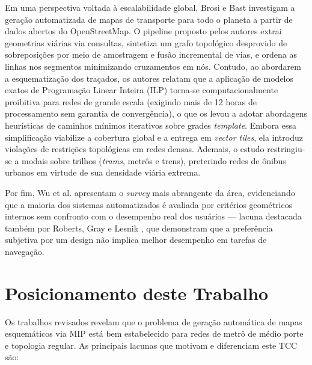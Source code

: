 \documentclass[cic,tc]{infufrgs}
\begin{document}
Em uma perspectiva voltada à escalabilidade global, Brosi e Bast \cite{brosi2023large} investigam a geração automatizada de mapas de transporte para todo o planeta a partir de dados abertos do OpenStreetMap. O pipeline proposto pelos autores extrai geometrias viárias via consultas, sintetiza um grafo topológico desprovido de sobreposições por meio de amostragem e fusão incremental de vias, e ordena as linhas nos segmentos minimizando cruzamentos em nós. Contudo, ao abordarem a esquematização dos traçados, os autores relatam que a aplicação de modelos exatos de Programação Linear Inteira (ILP) torna-se computacionalmente proibitiva para redes de grande escala (exigindo mais de 12 horas de processamento sem garantia de convergência), o que os levou a adotar abordagens heurísticas de caminhos mínimos iterativos sobre grades \textit{template}. Embora essa simplificação viabilize a cobertura global e a entrega em \textit{vector tiles}, ela introduz violações de restrições topológicas em redes densas. Ademais, o estudo restringiu-se a modais sobre trilhos (\textit{trams}, metrôs e trens), preterindo redes de ônibus urbanos em virtude de sua densidade viária extrema.

Por fim, Wu et al. \cite{Wu2020} apresentam o \textit{survey} mais abrangente da área, evidenciando que a maioria dos sistemas automatizados é avaliada por critérios geométricos internos sem confronto com o desempenho real dos usuários — lacuna destacada também por Roberts, Gray e Lesnik \cite{Roberts2016}, que demonstram que a preferência subjetiva por um design não implica melhor desempenho em tarefas de navegação.

\section{Posicionamento deste Trabalho}

Os trabalhos revisados revelam que o problema de geração automática de mapas esquemáticos via MIP está bem estabelecido para redes de metrô de médio porte e topologia regular. As principais lacunas que motivam e diferenciam este TCC são:
\end{document}
